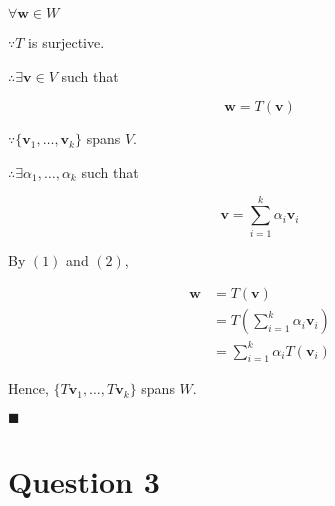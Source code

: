 \documentclass[12pt]{article}
\renewcommand{\qed}{\hfill$\blacksquare$}
\renewenvironment{proof}{\begin{addmargin}[1em]{0em}\begin{newproof}}{\end{newproof}\end{addmargin}\qed}
\begin{document}
\begin{proof}{}
    \noindent

    $\forall \mathbf{w}\in W$

    $\because T$ is surjective.

    $\therefore\exists\mathbf{v}\in V$ such that

    \begin{equation}
        \mathbf{w}=T(\mathbf{v})
    \end{equation}

    $\because \{\mathbf{v}_1,\dots,\mathbf{v}_k\}$ spans $V$.

    $\therefore\exists\alpha_1,\dots,\alpha_k$ such that

    \begin{equation}
        \mathbf{v}=\sum_{i=1}^{k}\alpha_i\mathbf{v}_i
    \end{equation}

    By $(1)$ and $(2)$,

    \begin{equation}
        \begin{aligned}
            \mathbf{w}&=T(\mathbf{v})\\
            &=T(\sum_{i=1}^{k}\alpha_i\mathbf{v}_i)\\
            &=\sum_{i=1}^{k}\alpha_iT(\mathbf{v}_i)
        \end{aligned}
    \end{equation}

    Hence, $\{T\mathbf{v}_1,\dots,T\mathbf{v}_k\}$ spans $W$.
\end{proof}

\pagebreak

\section{Question 3}
\end{document}
